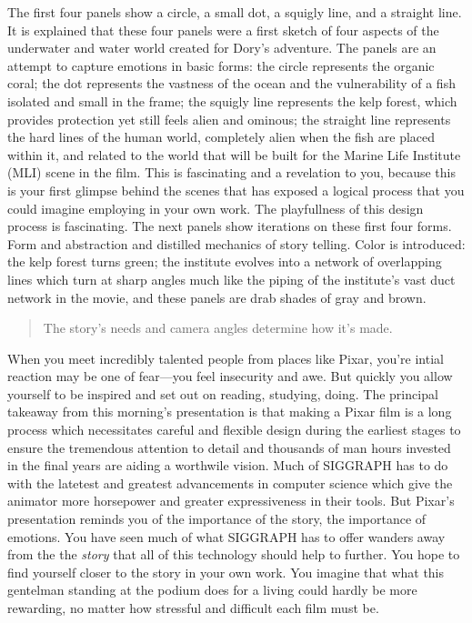 \documentclass[../main.tex]{subfiles}
\begin{document}
The first four panels show a circle, a small dot, a squigly line, and a straight line. It is explained that these four panels were a first sketch of four aspects of the underwater and water world created for Dory's adventure. The panels are an attempt to capture emotions in basic forms: the circle represents the organic coral; the dot represents the vastness of the ocean and the vulnerability of a fish isolated and small in the frame; the squigly line represents the kelp forest, which provides protection yet still feels alien and ominous; the straight line represents the hard lines of the human world, completely alien when the fish are placed within it, and related to the world that will be built for the Marine Life Institute (MLI) scene in the film. This is fascinating and a revelation to you, because this is your first glimpse behind the scenes that has exposed a logical process that you could imagine employing in your own work. The playfullness of this design process is fascinating. The next panels show iterations on these first four forms. Form and abstraction and distilled mechanics of story telling. Color is introduced: the kelp forest turns green; the institute evolves into a network of overlapping lines which turn at sharp angles much like the piping of the institute's vast duct network in the movie, and these panels are drab shades of gray and brown. 

\begin{quotation}
The story's needs and camera angles determine how it's made.
\end{quotation}

When you meet incredibly talented people from places like Pixar, you're intial reaction may be one of fear---you feel insecurity and awe. But quickly you allow yourself to be inspired and set out on reading, studying, doing. The principal takeaway from this morning's presentation is that making a Pixar film is a long process which necessitates careful and flexible design during the earliest stages to ensure the tremendous attention to detail and thousands of man hours invested in the final years are aiding a worthwile vision. Much of SIGGRAPH has to do with the latetest and greatest advancements in computer science which give the animator more horsepower and greater expressiveness in their tools. But Pixar's presentation reminds you of the importance of the story, the importance of emotions. You have seen much of what SIGGRAPH has to offer wanders away from the the \textit{story} that all of this technology should help to further. You hope to find yourself closer to the story in your own work. You imagine that what this gentelman standing at the podium does for a living could hardly be more rewarding, no matter how stressful and difficult each film must be.
\end{document}
